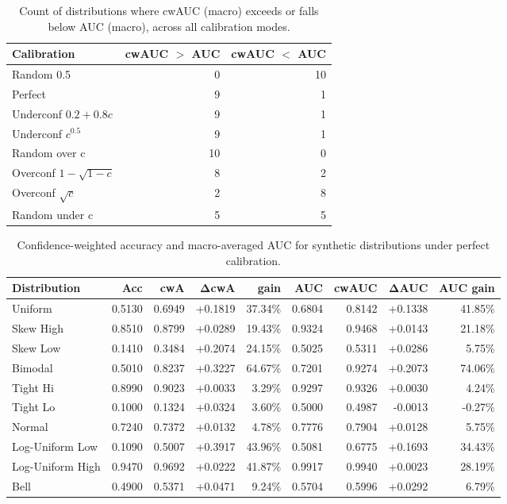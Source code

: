\documentclass{article}
\theoremstyle{plain}
\theoremstyle{definition}
\theoremstyle{remark}
\begin{document}
\begin{table}[ht]
\centering
\footnotesize
\begin{tabular}{lrr}
\toprule
\textbf{Calibration} & \textbf{cwAUC $>$ AUC} & \textbf{cwAUC $<$ AUC} \\
\midrule
Random 0.5 & 0 & 10 \\
Perfect & 9 & 1 \\
Underconf $0.2+0.8c$ & 9 & 1 \\
Underconf $c^{0.5}$ & 9 & 1 \\
Random over c & 10 & 0 \\
Overconf $1- \sqrt{1-c}$ & 8 & 2 \\
Overconf $\sqrt{c}$ & 2 & 8 \\
Random under c & 5 & 5 \\
\bottomrule
\end{tabular}
\caption{Count of distributions where cwAUC (macro) exceeds or falls below AUC (macro), across all calibration modes. }
\label{tab:cwauc_summary}
\end{table}




\begin{table}[ht]
\centering
\footnotesize
\begin{tabular}{lrrrrrrrr}
\toprule
\textbf{Distribution} & \textbf{Acc} & \textbf{cwA} & $\boldsymbol{\Delta}$\textbf{cwA} & \textbf{gain} & \textbf{AUC} & \textbf{cwAUC} & $\boldsymbol{\Delta}$\textbf{AUC } & \textbf{AUC gain} \\
\midrule
Uniform & 0.5130 & 0.6949 & +0.1819 & 37.34\% & 0.6804 & 0.8142 & +0.1338 & 41.85\% \\
Skew High & 0.8510 & 0.8799 & +0.0289 & 19.43\% & 0.9324 & 0.9468 & +0.0143 & 21.18\% \\
Skew Low & 0.1410 & 0.3484 & +0.2074 & 24.15\% & 0.5025 & 0.5311 & +0.0286 & 5.75\% \\
Bimodal & 0.5010 & 0.8237 & +0.3227 & 64.67\% & 0.7201 & 0.9274 & +0.2073 & 74.06\% \\
Tight Hi & 0.8990 & 0.9023 & +0.0033 & 3.29\% & 0.9297 & 0.9326 & +0.0030 & 4.24\% \\
Tight Lo & 0.1000 & 0.1324 & +0.0324 & 3.60\% & 0.5000 & 0.4987 & -0.0013 & -0.27\% \\
Normal & 0.7240 & 0.7372 & +0.0132 & 4.78\% & 0.7776 & 0.7904 & +0.0128 & 5.75\% \\
Log-Uniform Low & 0.1090 & 0.5007 & +0.3917 & 43.96\% & 0.5081 & 0.6775 & +0.1693 & 34.43\% \\
Log-Uniform High & 0.9470 & 0.9692 & +0.0222 & 41.87\% & 0.9917 & 0.9940 & +0.0023 & 28.19\% \\
Bell & 0.4900 & 0.5371 & +0.0471 & 9.24\% & 0.5704 & 0.5996 & +0.0292 & 6.79\% \\
\bottomrule
\end{tabular}
\caption{Confidence-weighted accuracy and macro-averaged AUC for synthetic distributions under perfect calibration. }
\label{tab:diffs_synthetic}
\end{table}
\end{document}
